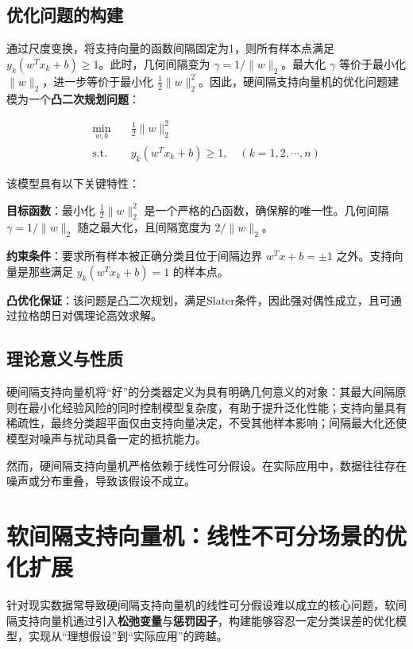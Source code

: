 \documentclass{article}
\newenvironment{solution_cn}{%
  \begin{proof}[解答]%
}{%
  \end{proof}%
}
\begin{document}
\begin{solution_cn}
\subsection{优化问题的构建}

通过尺度变换，将支持向量的函数间隔固定为1，则所有样本点满足 $ y_k (w^T x_k + b) \geq 1 $。此时，几何间隔变为 $ \gamma = 1 / \|w\|_2 $。最大化 $ \gamma $ 等价于最小化 $ \|w\|_2 $，进一步等价于最小化 $ \frac{1}{2} \|w\|_2^2 $。因此，硬间隔支持向量机的优化问题建模为一个\textbf{凸二次规划问题}：

\begin{equation}
\begin{split}
\min_{w,b} \quad & \frac{1}{2} \| w \|_2^2 \\
\text{s.t.} \quad & y_k (w^T x_k + b) \geq 1, \quad (k = 1,2,\cdots,n)
\end{split}
\end{equation}

该模型具有以下关键特性：

\textbf{目标函数}：最小化 $ \frac{1}{2} \|w\|_2^2 $ 是一个严格的凸函数，确保解的唯一性。几何间隔 $ \gamma = 1 / \|w\|_2 $ 随之最大化，且间隔宽度为 $ 2 / \|w\|_2 $。

\textbf{约束条件}：要求所有样本被正确分类且位于间隔边界 $ w^T x + b = \pm 1 $ 之外。支持向量是那些满足 $ y_k (w^T x_k + b) = 1 $ 的样本点。

\textbf{凸优化保证}：该问题是凸二次规划，满足Slater条件，因此强对偶性成立，且可通过拉格朗日对偶理论高效求解。

\subsection{理论意义与性质}

硬间隔支持向量机将“好”的分类器定义为具有明确几何意义的对象：其最大间隔原则在最小化经验风险的同时控制模型复杂度，有助于提升泛化性能；支持向量具有稀疏性，最终分类超平面仅由支持向量决定，不受其他样本影响；间隔最大化还使模型对噪声与扰动具备一定的抵抗能力。

然而，硬间隔支持向量机严格依赖于线性可分假设。在实际应用中，数据往往存在噪声或分布重叠，导致该假设不成立。

\section{软间隔支持向量机：线性不可分场景的优化扩展}
针对现实数据常导致硬间隔支持向量机的线性可分假设难以成立的核心问题，软间隔支持向量机通过引入\textbf{松弛变量}与\textbf{惩罚因子}，构建能够容忍一定分类误差的优化模型，实现从“理想假设”到“实际应用”的跨越。


\end{solution_cn}
\end{document}
